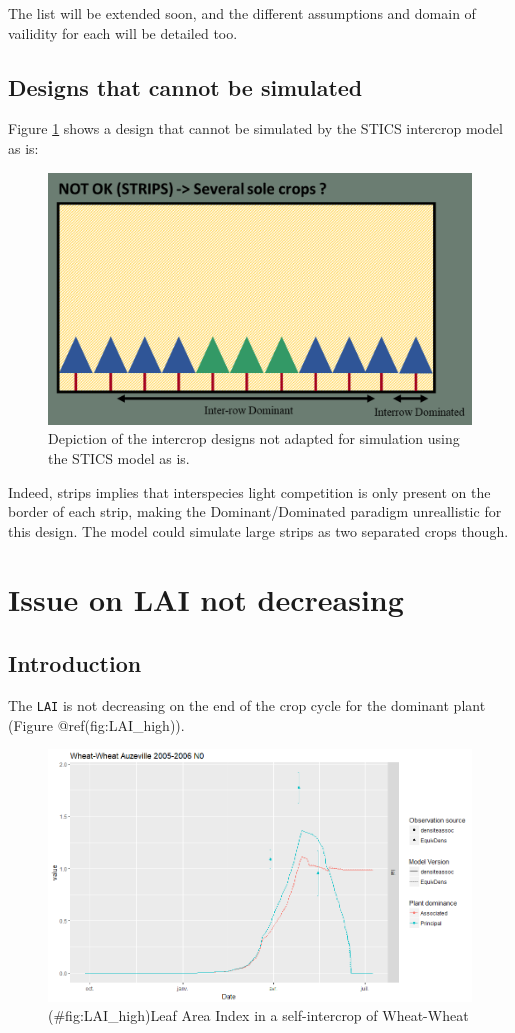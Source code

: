 \documentclass[]{book}
\theoremstyle{definition}
\theoremstyle{definition}
\theoremstyle{definition}
\theoremstyle{remark}
\begin{document}
The list will be extended soon, and the different assumptions and domain
of vailidity for each will be detailed too.

\section{Designs that cannot be
simulated}\label{designs-that-cannot-be-simulated}

Figure \ref{fig:DesignKO} shows a design that cannot be simulated by the
STICS intercrop model as is:

\begin{figure}
\centering
\includegraphics{img/Design_KO.png}
\caption{\label{fig:DesignKO}Depiction of the intercrop designs not adapted
for simulation using the STICS model as is.}
\end{figure}

Indeed, strips implies that interspecies light competition is only
present on the border of each strip, making the Dominant/Dominated
paradigm unreallistic for this design. The model could simulate large
strips as two separated crops though.

\chapter{Issue on LAI not decreasing}\label{LAI_issue}

\section{Introduction}\label{introduction-5}

The \texttt{LAI} is not decreasing on the end of the crop cycle for the
dominant plant (Figure @ref(fig:LAI\_high)).

\begin{figure}
\centering
\includegraphics{img/LAI_high.png}
\caption{(\#fig:LAI\_high)Leaf Area Index in a self-intercrop of
Wheat-Wheat}
\end{figure}


\end{document}
